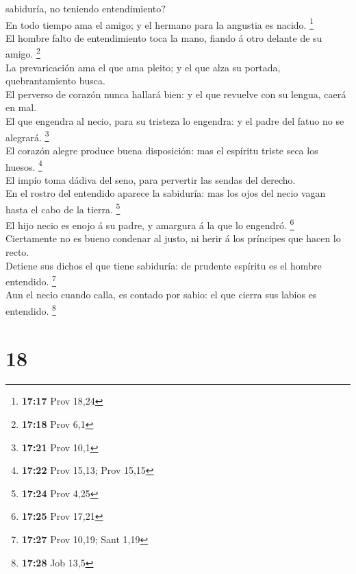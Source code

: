 sabiduría, no teniendo entendimiento?\\
 En todo tiempo ama el amigo; y el hermano para la angustia
es nacido. \footnote{\textbf{17:17} Prov 18,24}\\
 El hombre falto de entendimiento toca la mano, fiando á
otro delante de su amigo. \footnote{\textbf{17:18} Prov 6,1}\\
 La prevaricación ama el que ama pleito; y el que alza su
portada, quebrantamiento busca.\\
 El perverso de corazón nunca hallará bien: y el que
revuelve con su lengua, caerá en mal.\\
 El que engendra al necio, para su tristeza lo engendra: y
el padre del fatuo no se alegrará. \footnote{\textbf{17:21} Prov 10,1}\\
 El corazón alegre produce buena disposición: mas el
espíritu triste seca los huesos. \footnote{\textbf{17:22} Prov 15,13;
  Prov 15,15}\\
 El impío toma dádiva del seno, para pervertir las sendas
del derecho.\\
 En el rostro del entendido aparece la sabiduría: mas los
ojos del necio vagan hasta el cabo de la tierra. \footnote{\textbf{17:24}
  Prov 4,25}\\
 El hijo necio es enojo á su padre, y amargura á la que lo
engendró. \footnote{\textbf{17:25} Prov 17,21}\\
 Ciertamente no es bueno condenar al justo, ni herir á los
príncipes que hacen lo recto.\\
 Detiene sus dichos el que tiene sabiduría: de prudente
espíritu es el hombre entendido. \footnote{\textbf{17:27} Prov 10,19;
  Sant 1,19}\\
 Aun el necio cuando calla, es contado por sabio: el que
cierra sus labios es entendido. \footnote{\textbf{17:28} Job 13,5}

\hypertarget{section-17}{%
\section{18}\label{section-17}}

